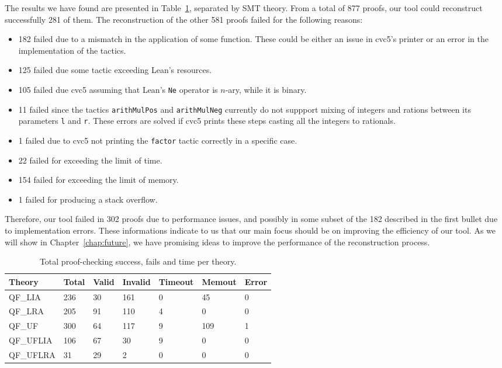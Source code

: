 The results we have found are presented in Table~\ref{bench}, separated
by SMT theory. From a total of 877 proofs, our tool could reconstruct
successfully 281 of them. The reconstruction of the other 581 proofs
failed for the following reasons:

\begin{itemize}
  \item 182 failed due to a mismatch in the application of some function. These could be either an issue in cvc5's printer or an error in the implementation of the tactics.
  \item 125 failed due some tactic exceeding Lean's resources.
  \item 105 failed due cvc5 assuming that Lean's \texttt{Ne} operator is $n$-ary, while it is binary.
  \item 11 failed since the tactics \texttt{arithMulPos} and \texttt{arithMulNeg} currently do not suppport mixing of integers and rations between its parameters \texttt{l} and \texttt{r}. These errors are solved if cvc5 prints these steps casting all the integers to rationals.
  \item 1 failed due to cvc5 not printing the \texttt{factor} tactic correctly in a specific case.
  \item 22 failed for exceeding the limit of time.
  \item 154 failed for exceeding the limit of memory.
  \item 1 failed for producing a stack overflow.
\end{itemize}

Therefore, our tool failed in 302 proofs due to performance issues, and
possibly in some subset of the 182 described in the first bullet due to
implementation errors. These informations indicate to us that our main
focus should be on improving the efficiency of our tool. As we will
show in Chapter~\ref{chap:future}, we have promising ideas to improve
the performance of the reconstruction process.


\begin{table}[t]
\centering
\begin{tabular}{ l l l l l l l }
\toprule
Theory & Total & Valid & Invalid & Timeout & Memout & Error \\ \midrule
QF\_LIA & 236 & 30 & 161 & 0 & 45 & 0 \\ \midrule
QF\_LRA & 205 & 91 & 110 & 4 & 0 & 0 \\ \midrule
QF\_UF & 300 & 64 & 117 & 9 & 109 & 1 \\ \midrule
QF\_UFLIA & 106 & 67 & 30 & 9 & 0 & 0  \\ \midrule
QF\_UFLRA & 31 & 29 & 2 & 0 & 0 & 0 \\ \bottomrule
\end{tabular}
\caption{Total proof-checking success, fails and time per theory.}\label{bench}
\end{table}

